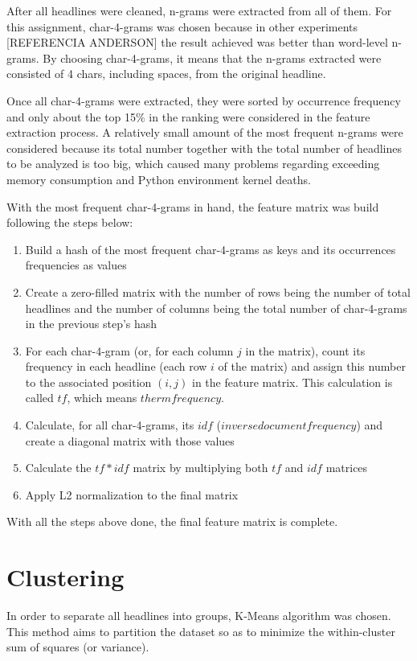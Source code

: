 \documentclass[10pt,twocolumn,letterpaper]{article}
\begin{document}
After all headlines were cleaned, n-grams were extracted from all of them. For this assignment, char-4-grams was chosen because in other experiments [REFERENCIA ANDERSON] the result achieved was better than word-level n-grams. By choosing char-4-grams, it means that the n-grams extracted were consisted of 4 chars, including spaces, from the original headline.

Once all char-4-grams were extracted, they were sorted by occurrence frequency and only about the top 15$\%$ in the ranking were considered in the feature extraction process. A relatively small amount of the most frequent n-grams were considered because its total number together with the total number of headlines to be analyzed is too big, which caused many problems regarding exceeding memory consumption and Python environment kernel deaths.

With the most frequent char-4-grams in hand, the feature matrix was build following the steps below:
\begin{enumerate}
	\item Build a hash of the most frequent char-4-grams as keys and its occurrences frequencies as values
	\item Create a zero-filled matrix with the number of rows being the number of total headlines and the number of columns being the total number of char-4-grams in the previous step's hash
	\item For each char-4-gram (or, for each column $j$ in the matrix), count its frequency in each headline (each row $i$ of the matrix) and assign this number to the associated position $(i,j)$ in the feature matrix. This calculation is called $tf$, which means $therm frequency$.
	\item Calculate, for all char-4-grams, its $idf$ ($inverse document frequency$) and create a diagonal matrix with those values
	\item Calculate the $tf*idf$ matrix by multiplying both $tf$ and $idf$ matrices
	\item Apply L2 normalization to the final matrix
\end{enumerate}

With all the steps above done, the final feature matrix is complete.

\section{Clustering}
In order to separate all headlines into groups, K-Means algorithm was chosen. This method aims to partition the dataset so as to minimize the within-cluster sum of squares (or variance).
\end{document}

